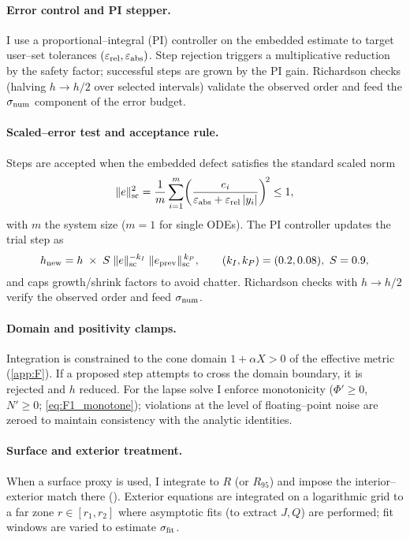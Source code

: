 \documentclass{iopjournal}
\begin{document}
\paragraph{Error control and PI stepper.}
I use a proportional–integral (PI) controller on the embedded estimate to target user–set tolerances $(\varepsilon_{\rm rel},\varepsilon_{\rm abs})$. Step rejection triggers a multiplicative reduction by the safety factor; successful steps are grown by the PI gain. Richardson checks (halving $h\!\to\!h/2$ over selected intervals) validate the observed order and feed the $\sigma_{\rm num}$ component of the error budget.
\paragraph{Scaled–error test and acceptance rule.}
Steps are accepted when the embedded defect satisfies the standard scaled norm
\begin{equation}
\|e\|_{\rm sc}^2=\frac{1}{m}\sum_{i=1}^{m}\!\left(\frac{e_i}{\varepsilon_{\rm abs}+\varepsilon_{\rm rel}\,|y_i|}\right)^{\!2}\le 1,
\label{eq:K1_fit_resid}
\end{equation}
with $m$ the system size ($m=1$ for single ODEs). The PI controller updates the trial step as
\begin{equation}
h_{\rm new}=h\;\times\;S\;\|e\|_{\rm sc}^{-k_I}\;\|e_{\rm prev}\|_{\rm sc}^{\,k_P},
\qquad (k_I,k_P)=(0.2,0.08),\ S=0.9,
\label{eq:K1_PI_update}
\end{equation}
and caps growth/shrink factors to avoid chatter. Richardson checks with $h\!\to\!h/2$ verify the observed order and feed $\sigma_{\rm num}$.


\paragraph{Domain and positivity clamps.}
Integration is constrained to the cone domain $1+\alpha X>0$ of the effective metric (\cref{app:F}). If a proposed step attempts to cross the domain boundary, it is rejected and $h$ reduced. For the lapse solve I enforce monotonicity ($\Phi'\!\ge0$, $N'\!\ge0$; \eqref{eq:F1_monotone}); violations at the level of floating–point noise are zeroed to maintain consistency with the analytic identities.

\paragraph{Surface and exterior treatment.}
When a surface proxy is used, I integrate to $R$ (or $R_{95}$) and impose the interior–exterior match there (). Exterior equations are integrated on a logarithmic grid to a far zone $r\in[r_1,r_2]$ where asymptotic fits (to extract $J,Q$) are performed; fit windows are varied to estimate $\sigma_{\rm fit}$.
\end{document}
